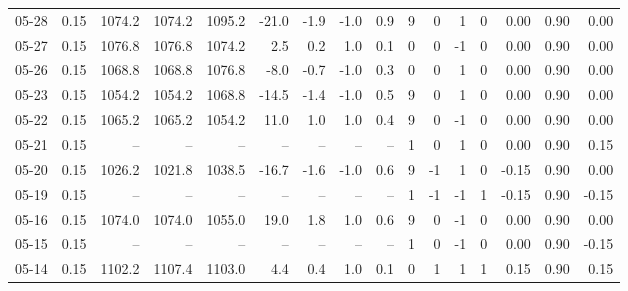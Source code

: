 \begin{threeparttable}
{\begin{tabular}{lrrrrrrrrrrrrrrr}
  05-28 &     0.15 & 1074.2 & 1074.2 & 1095.2 &      -21.0 &           -1.9 &                     -1.0 &                 0.9 &              9 &         0 &     1 &         0 &       0.00 &      0.90 &           0.00 \\
  05-27 &     0.15 & 1076.8 & 1076.8 & 1074.2 &        2.5 &            0.2 &                      1.0 &                 0.1 &              0 &         0 &    -1 &         0 &       0.00 &      0.90 &           0.00 \\
  05-26 &     0.15 & 1068.8 & 1068.8 & 1076.8 &       -8.0 &           -0.7 &                     -1.0 &                 0.3 &              0 &         0 &     1 &         0 &       0.00 &      0.90 &           0.00 \\
  05-23 &     0.15 & 1054.2 & 1054.2 & 1068.8 &      -14.5 &           -1.4 &                     -1.0 &                 0.5 &              9 &         0 &     1 &         0 &       0.00 &      0.90 &           0.00 \\
  05-22 &     0.15 & 1065.2 & 1065.2 & 1054.2 &       11.0 &            1.0 &                      1.0 &                 0.4 &              9 &         0 &    -1 &         0 &       0.00 &      0.90 &           0.00 \\
  05-21 &     0.15 &     -- &     -- &     -- &         -- &             -- &                       -- &                  -- &              1 &         0 &     1 &         0 &       0.00 &      0.90 &           0.15 \\
  05-20 &     0.15 & 1026.2 & 1021.8 & 1038.5 &      -16.7 &           -1.6 &                     -1.0 &                 0.6 &              9 &        -1 &     1 &         0 &      -0.15 &      0.90 &           0.00 \\
  05-19 &     0.15 &     -- &     -- &     -- &         -- &             -- &                       -- &                  -- &              1 &        -1 &    -1 &         1 &      -0.15 &      0.90 &          -0.15 \\
  05-16 &     0.15 & 1074.0 & 1074.0 & 1055.0 &       19.0 &            1.8 &                      1.0 &                 0.6 &              9 &         0 &    -1 &         0 &       0.00 &      0.90 &           0.00 \\
  05-15 &     0.15 &     -- &     -- &     -- &         -- &             -- &                       -- &                  -- &              1 &         0 &    -1 &         0 &       0.00 &      0.90 &          -0.15 \\
  05-14 &     0.15 & 1102.2 & 1107.4 & 1103.0 &        4.4 &            0.4 &                      1.0 &                 0.1 &              0 &         1 &     1 &         1 &       0.15 &      0.90 &           0.15 \\

\end{tabular}}
\end{threeparttable}

